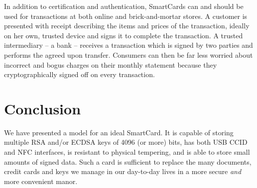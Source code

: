 \documentclass[11pt, twocolumn]{article}
\begin{document}
In addition to certification and authentication, SmartCards can and should be
used for transactions at both online and brick-and-mortar stores. A customer is
presented with receipt describing the items and prices of the transaction,
ideally on her own, trusted device and signs it to complete the transaction. A
trusted intermediary -- a bank -- receives a transaction which is signed by two
parties and performs the agreed upon transfer. Consumers can then be far less
worried about incorrect and bogus charges on their monthly statement because
they cryptographically signed off on every transaction.

\section{Conclusion}
\label{sec:conclusion}

We have presented a model for an ideal SmartCard. It is capable of storing
multiple RSA and/or ECDSA keys of 4096 (or more) bits, has both USB CCID and
NFC interfaces, is resistant to physical tempering, and is able to store small
amounts of signed data. Such a card is sufficient to replace the many documents,
credit cards and keys we manage in our day-to-day lives in a more secure
\textit{and} more convenient manor.


\nocite{*}

\end{document}
